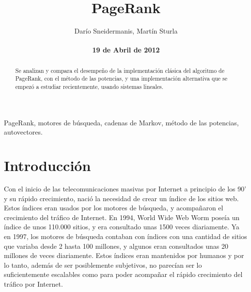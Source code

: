 \documentclass[%
    final,
    notitlepage,
    narroweqnarray,
    inline,
    twoside,
    invited
    ]{lib/ieee}
\begin{document}
\title[PageRank]{%
       PageRank}

\author[Sneidermanis, Sturla]{Darío Sneidermanis, Martín Sturla\\
\\\textbf{19 de Abril de 2012}
}



\lognumber{}
\pubitemident{}


\maketitle

\begin{abstract}
Se analizan y compara el desempeño de la implementación clásica del algoritmo de PageRank, con el método de las potencias, y una implementación
alternativa que se empezó a estudiar recientemente, usando sistemas lineales.
\end{abstract}

\begin{keywords}
PageRank, motores de búsqueda, cadenas de Markov, método de las potencias, autovectores.
\end{keywords}

\section{Introducción}
Con el inicio de las telecomunicaciones masivas por Internet a principio de los 90' y su rápido crecimiento, nació la necesidad de
crear un índice de los sitios web. Estos índices eran usados por los motores de búsqueda, y acompañaron el crecimiento del tráfico
de Internet. En 1994, World Wide Web Worm poseía un índice de unos 110.000 sitios, y era consultado unas 1500 veces diariamente. Ya en
1997, los motores de búsqueda contaban con índices con una cantidad de sitios que variaba desde 2 hasta 100 millones, y algunos eran consultados
unas 20 millones de veces diariamente. Estos índices eran mantenidos por humanos y por lo tanto, además de ser posiblemente subjetivos,
no parecían ser lo suficientemente escalables como para poder acompañar el rápido crecimiento del tráfico por Internet. \\
\end{document}
